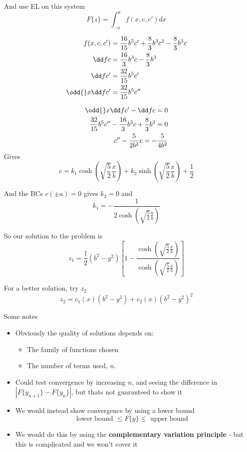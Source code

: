 \documentclass{E:/Documents/Latex/myassignment}
\begin{document}
And use EL on this system 
\[F\{z\} = \int_{-a}^a f(x,c,c') dx\]

\begin{align*}
	f(x,c,c') &= \frac{16}{15} b^5 c' + \frac83 b^3 c^2 - \frac83 b^3 c\\
	\dd fc &= \frac{16}3 b^3 c - \frac83 b^3\\
	\dd f{c'} &= \frac{32}{15}b^5c'\\
	\odd{}x \dd f{c'} &= \frac{32}{15} b^5 c''
\end{align*}

\begin{align*}
	\odd{}x \dd f{c'} - \dd fc = 0 \\
	\frac{32}{15} b^5 c'' -\frac{16}3 b^3 c + \frac83 b^3 = 0\\
	c'' - \frac{5}{2b^2} c = -\frac{5}{4b^2}
\end{align*}
Gives
\[c = k_1 \cosh\left(\sqrt{\frac52} \frac{x}{b}\right) + k_2 \sinh\left(\sqrt{\frac52} \frac{x}{b}\right) + \frac12\]

And the BCs $c(\pm a) = 0$ gives $k_2 = 0$ and
\[k_1 = -\frac{1}{2\cosh\left(\sqrt{\frac52} \frac ab\right)}\]


So our solution to the problem is
\[z_1 = \frac12 \left(b^2-y^2\right) \left[1 - \frac{\cosh\left(\sqrt{\frac52} \frac{x}{b}\right) }{\cosh\left(\sqrt{\frac52} \frac ab\right)}\right]\]

For a better solution, try $z_2$
\[z_2 = c_1(x)(b^2-y^2) + c_2(x) (b^2-y^2)^2\]


Some notes
\begin{itemize}
	\item Obviously the quality of solutions depends on:
	\begin{itemize}
		\item The family of functions chosen
		\item The number of terms used, $n$.
	\end{itemize}
	\item Could test convergence by increasing $n$, and seeing the difference in $|F\{y_{n+1}\} - F\{y_n\}|$, but thats not guaranteed to show it
	\item We would instead show convergence by using a lower bound
	\[\text{lower bound }\leq F\{y\} \leq \text{ upper bound}\]
	\item We would do this by using the \textbf{complementary variation principle} - but this is complicated and we won't cover it
\end{itemize}
\end{document}

